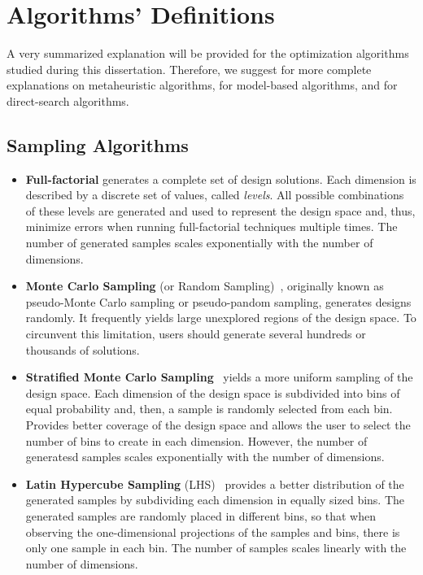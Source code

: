 \chapter{Algorithms' Definitions}
\label{appendix:AlgorithmsDefinitions}

A very summarized explanation will be provided for the optimization algorithms studied during this dissertation. Therefore, we suggest \cite{BlumRoli2003Metaheuristics,Glover2003Metaheuristics,Zhou2011} for more complete explanations on metaheuristic algorithms, \cite{Koziel2011} for model-based algorithms, and \cite{Conn2009,Custodio2010,Custodio2018} for direct-search algorithms.

\section{Sampling Algorithms} 
\begin{itemize}
\item \textbf{Full-factorial} generates a complete set of design solutions. Each dimension is described by a discrete set of values, called \textit{levels}. All possible combinations of these levels are generated and used to represent the design space and, thus, minimize errors when running full-factorial techniques multiple times. The number of generated samples scales exponentially with the number of dimensions. 
	
\item \textbf{Monte Carlo Sampling} (or Random Sampling)~\cite{Giunta2003DOE}, originally known as pseudo-Monte Carlo sampling or pseudo-pandom sampling, generates designs randomly. It frequently yields large unexplored regions of the design space. To circunvent this limitation, users should generate several hundreds or thousands of solutions.

\item \textbf{Stratified Monte Carlo Sampling}~\cite{Giunta2003DOE} yields a more uniform sampling of the design space. Each dimension of the design space is subdivided into bins of equal probability and, then, a sample is randomly selected from each bin. Provides better coverage of the design space and allows the user to select the number of bins to create in each dimension. However, the number of generatesd samples scales exponentially with the number of dimensions.

\item \textbf{Latin Hypercube Sampling} (LHS)~\cite{Giunta2003DOE} provides a better distribution of the generated samples by subdividing each dimension in equally sized bins. The generated samples are randomly placed in different bins, so that when observing the one-dimensional projections of the samples and bins, there is only one sample in each bin. The number of samples scales linearly with the number of dimensions.
\end{itemize}

